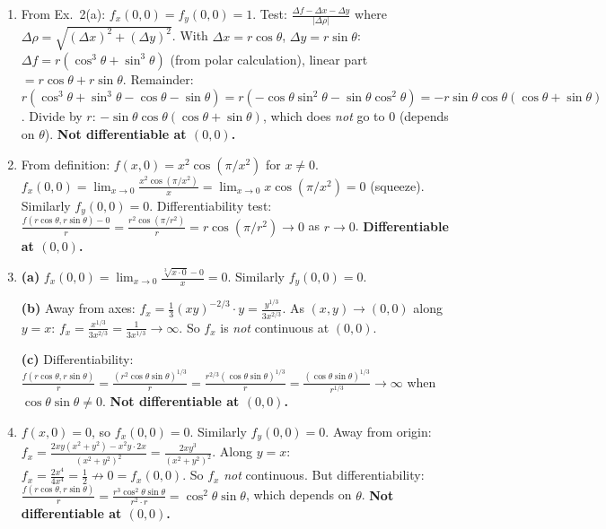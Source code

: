 \documentclass[12pt,a4paper]{article}
\begin{document}
\begin{enumerate}[leftmargin=*, label=(\alph*)]

\item From Ex.~2(a): $f_x(0,0)=f_y(0,0)=1$.
Test: $\frac{\Delta f-\Delta x-\Delta y}{|\Delta\rho|}$ where $\Delta\rho=\sqrt{(\Delta x)^2+(\Delta y)^2}$.
With $\Delta x=r\cos\theta$, $\Delta y=r\sin\theta$:
$\Delta f=r(\cos^3\theta+\sin^3\theta)$ (from polar calculation), linear part $=r\cos\theta+r\sin\theta$.
Remainder: $r(\cos^3\theta+\sin^3\theta-\cos\theta-\sin\theta)=r(-\cos\theta\sin^2\theta-\sin\theta\cos^2\theta)=-r\sin\theta\cos\theta(\cos\theta+\sin\theta)$.
Divide by $r$: $-\sin\theta\cos\theta(\cos\theta+\sin\theta)$, which does \emph{not} go to $0$ (depends on $\theta$).
\textbf{Not differentiable at $(0,0)$.}

\item From definition: $f(x,0)=x^2\cos(\pi/x^2)$ for $x\ne 0$.
$f_x(0,0)=\lim_{x\to 0}\frac{x^2\cos(\pi/x^2)}{x}=\lim_{x\to 0}x\cos(\pi/x^2)=0$ (squeeze).
Similarly $f_y(0,0)=0$.
Differentiability test: $\frac{f(r\cos\theta,r\sin\theta)-0}{r}=\frac{r^2\cos(\pi/r^2)}{r}=r\cos(\pi/r^2)\to 0$ as $r\to 0$.
\textbf{Differentiable at $(0,0)$.}

\item[(c)] \textbf{(a)} $f_x(0,0)=\lim_{x\to 0}\frac{\sqrt[3]{x\cdot 0}-0}{x}=0$. Similarly $f_y(0,0)=0$.

\textbf{(b)} Away from axes: $f_x=\frac{1}{3}(xy)^{-2/3}\cdot y=\frac{y^{1/3}}{3x^{2/3}}$. As $(x,y)\to(0,0)$ along $y=x$: $f_x=\frac{x^{1/3}}{3x^{2/3}}=\frac{1}{3x^{1/3}}\to\infty$. So $f_x$ is \emph{not} continuous at $(0,0)$.

\textbf{(c)} Differentiability: $\frac{f(r\cos\theta,r\sin\theta)}{r}=\frac{(r^2\cos\theta\sin\theta)^{1/3}}{r}=\frac{r^{2/3}(\cos\theta\sin\theta)^{1/3}}{r}=\frac{(\cos\theta\sin\theta)^{1/3}}{r^{1/3}}\to\infty$ when $\cos\theta\sin\theta\ne 0$. \textbf{Not differentiable at $(0,0)$.}

\item[(d)] $f(x,0)=0$, so $f_x(0,0)=0$. Similarly $f_y(0,0)=0$.
Away from origin: $f_x=\frac{2xy(x^2+y^2)-x^2y\cdot 2x}{(x^2+y^2)^2}=\frac{2xy^3}{(x^2+y^2)^2}$.
Along $y=x$: $f_x=\frac{2x^4}{4x^4}=\frac{1}{2}\not\to 0=f_x(0,0)$. So $f_x$ \emph{not} continuous.
But differentiability: $\frac{f(r\cos\theta,r\sin\theta)}{r}=\frac{r^3\cos^2\theta\sin\theta}{r^2\cdot r}=\cos^2\theta\sin\theta$, which depends on $\theta$.
\textbf{Not differentiable at $(0,0)$.}

\end{enumerate}
\end{document}
